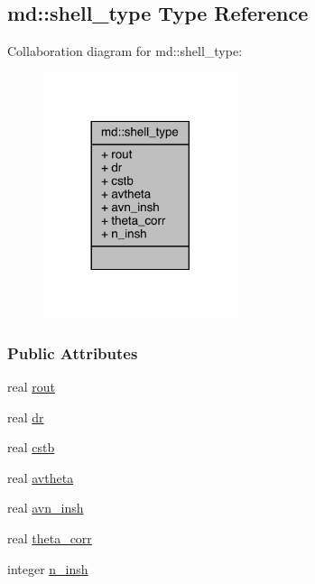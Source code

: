 \hypertarget{structmd_1_1shell__type}{\subsection{md\-:\-:shell\-\_\-type Type Reference}
\label{structmd_1_1shell__type}
}


Collaboration diagram for md\-:\-:shell\-\_\-type\-:
\nopagebreak
\begin{figure}[H]
\begin{center}
\leavevmode
\includegraphics[width=161pt]{structmd_1_1shell__type__coll__graph}
\end{center}
\end{figure}
\subsubsection*{Public Attributes}
\begin{DoxyCompactItemize}
\item 
real \hyperlink{structmd_1_1shell__type_a16f41defd8b2f789f7ce155b413a3ef6}{rout}
\item 
real \hyperlink{structmd_1_1shell__type_a6ab5044b26cea9283af4704e9ab4b6f2}{dr}
\item 
real \hyperlink{structmd_1_1shell__type_a09366e8ec0ac3346eddeabbcab3136fe}{cstb}
\item 
real \hyperlink{structmd_1_1shell__type_a235f1c472b401050d501343c1657f4bf}{avtheta}
\item 
real \hyperlink{structmd_1_1shell__type_a72fa2cb5fb77254f7937e3c63edb686b}{avn\-\_\-insh}
\item 
real \hyperlink{structmd_1_1shell__type_a9af95ecc7415730d5696ff61a2275081}{theta\-\_\-corr}
\item 
integer \hyperlink{structmd_1_1shell__type_a00c2da5a563e84b368a020bc8b11f835}{n\-\_\-insh}
\end{DoxyCompactItemize}


